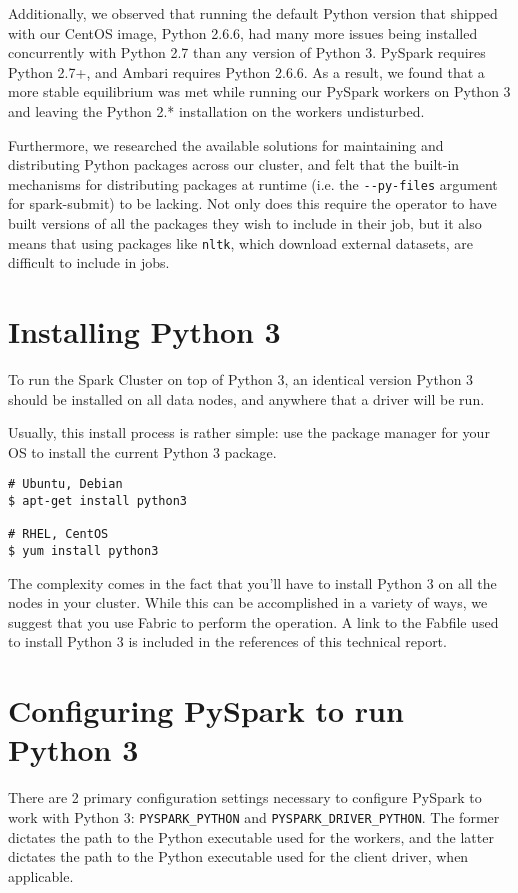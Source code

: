 \documentclass[9pt,twocolumn,twoside]{idsi}
\begin{document}
Additionally, we observed that running the default Python version that shipped with our CentOS image, Python 2.6.6, had many more issues being installed concurrently with Python 2.7 than any version of Python 3. PySpark requires Python 2.7+, and Ambari requires Python 2.6.6. As a result, we found that a more stable equilibrium was met while running our PySpark workers on Python 3 and leaving the Python 2.* installation on the workers undisturbed.

Furthermore, we researched the available solutions for maintaining and distributing Python packages across our cluster, and felt that the built-in mechanisms for distributing packages at runtime (i.e. the \texttt{-\--py-files} argument for spark-submit) to be lacking. Not only does this require the operator to have built versions of all the packages they wish to include in their job, but it also means that using packages like \texttt{nltk}, which download external datasets, are difficult to include in jobs.

\section{Installing Python 3}
To run the Spark Cluster on top of Python 3, an identical version Python 3 should be installed on all data nodes, and anywhere that a driver will be run.

Usually, this install process is rather simple: use the package manager for your OS to install the current Python 3 package.

\begin{verbatim}
# Ubuntu, Debian
$ apt-get install python3

# RHEL, CentOS
$ yum install python3
\end{verbatim}

The complexity comes in the fact that you'll have to install Python 3 on all the nodes in your cluster. While this can be accomplished in a variety of ways, we suggest that you use Fabric to perform the operation. A link to the Fabfile used to install Python 3 is included in the references of this technical report.

\section{Configuring PySpark to run Python 3}

There are 2 primary configuration settings necessary to configure PySpark to work with Python 3: \texttt{PYSPARK\_PYTHON} and \texttt{PYSPARK\_DRIVER\_PYTHON}. The former dictates the path to the Python executable used for the workers, and the latter dictates the path to the Python executable used for the client driver, when applicable.
\end{document}
